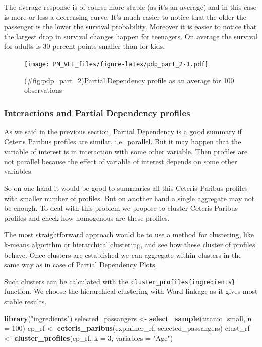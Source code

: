 \documentclass[]{krantz}
\newenvironment{Shaded}{\begin{snugshade}}{\end{snugshade}}
\newcommand{\DataTypeTok}[1]{\textcolor[rgb]{0.13,0.29,0.53}{#1}}
\newcommand{\DecValTok}[1]{\textcolor[rgb]{0.00,0.00,0.81}{#1}}
\newcommand{\KeywordTok}[1]{\textcolor[rgb]{0.13,0.29,0.53}{\textbf{#1}}}
\newcommand{\NormalTok}[1]{#1}
\newcommand{\StringTok}[1]{\textcolor[rgb]{0.31,0.60,0.02}{#1}}
\theoremstyle{definition}
\theoremstyle{definition}
\theoremstyle{definition}
\theoremstyle{remark}
\begin{document}
The average response is of course more stable (as it's an average) and
in this case is more or less a decreasing curve. It's much easier to
notice that the older the passenger is the lower the survival
probability. Moreover it is easier to notice that the largest drop in
survival changes happen for teenagers. On average the survival for
adults is 30 percent points smaller than for kids.

\begin{figure}
\centering
\texttt{[image: PM\_VEE\_files/figure-latex/pdp\_part\_2-1.pdf]}
\caption{(\#fig:pdp\_part\_2)Partial Dependency profile as an average
for 100 observations}
\end{figure}

\hypertarget{interactions-and-partial-dependency-profiles}{%
\subsubsection{Interactions and Partial Dependency
profiles}\label{interactions-and-partial-dependency-profiles}}

As we said in the previous section, Partial Dependency is a good summary
if Ceteris Paribus profiles are similar, i.e.~parallel. But it may
happen that the variable of interest is in interaction with some other
variable. Then profiles are not parallel because the effect of variable
of interest depends on some other variables.

So on one hand it would be good to summaries all this Ceteris Paribus
profiles with smaller number of profiles. But on another hand a single
aggregate may not be enough. To deal with this problem we propose to
cluster Ceteris Paribus profiles and check how homogenous are these
profiles.

The most straightforward approach would be to use a method for
clustering, like k-means algorithm or hierarchical clustering, and see
how these cluster of profiles behave. Once clusters are established we
can aggregate within clusters in the same way as in case of Partial
Dependency Plots.

Such clusters can be calculated with the
\texttt{cluster\_profiles\{ingredients\}} function. We choose the
hierarchical clustering with Ward linkage as it gives most stable
results.

\begin{Shaded}
\begin{Highlighting}[]
\KeywordTok{library}\NormalTok{(}\StringTok{"ingredients"}\NormalTok{)}
\NormalTok{selected_passangers <-}\StringTok{ }\KeywordTok{select_sample}\NormalTok{(titanic_small, }\DataTypeTok{n =} \DecValTok{100}\NormalTok{)}
\NormalTok{cp_rf <-}\StringTok{ }\KeywordTok{ceteris_paribus}\NormalTok{(explainer_rf, selected_passangers)}
\NormalTok{clust_rf <-}\StringTok{ }\KeywordTok{cluster_profiles}\NormalTok{(cp_rf, }\DataTypeTok{k =} \DecValTok{3}\NormalTok{, }\DataTypeTok{variables =} \StringTok{"Age"}\NormalTok{)}
\end{Highlighting}
\end{Shaded}
\end{document}
